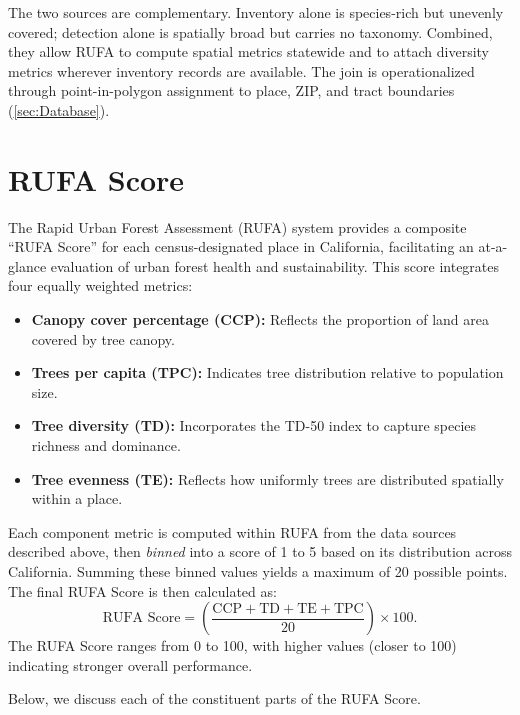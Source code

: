 The two sources are complementary. Inventory alone is species-rich but unevenly covered; detection alone is spatially broad but carries no taxonomy. Combined, they allow RUFA to compute spatial metrics statewide and to attach diversity metrics wherever inventory records are available. The join is operationalized through point-in-polygon assignment to place, ZIP, and tract boundaries (\autoref{sec:Database}).

\section{RUFA Score} \label{sec:RUFA_Score}

The Rapid Urban Forest Assessment (RUFA) system provides a composite ``RUFA Score'' for each census-designated place in California, facilitating an at-a-glance evaluation of urban forest health and sustainability. This score integrates four equally weighted metrics:

\begin{itemize}
    \item \textbf{Canopy cover percentage (CCP):} Reflects the proportion of land area covered by tree canopy.
    \item \textbf{Trees per capita (TPC):} Indicates tree distribution relative to population size.
    \item \textbf{Tree diversity (TD):} Incorporates the TD-50 index \cite{love2022} to capture species richness and dominance.
    \item \textbf{Tree evenness (TE):} Reflects how uniformly trees are distributed spatially within a place.
\end{itemize}

Each component metric is computed within RUFA from the data sources described above, then \textit{binned} into a score of 1 to 5 based on its distribution across California. Summing these binned values yields a maximum of 20 possible points. The final RUFA Score is then calculated as:
\begin{equation}
    \text{RUFA Score} = \left( \frac{\text{CCP} + \text{TD} + \text{TE} + \text{TPC}}{20} \right) \times 100.
\end{equation}
The RUFA Score ranges from 0 to 100, with higher values (closer to 100) indicating stronger overall performance.

Below, we discuss each of the constituent parts of the RUFA Score.

